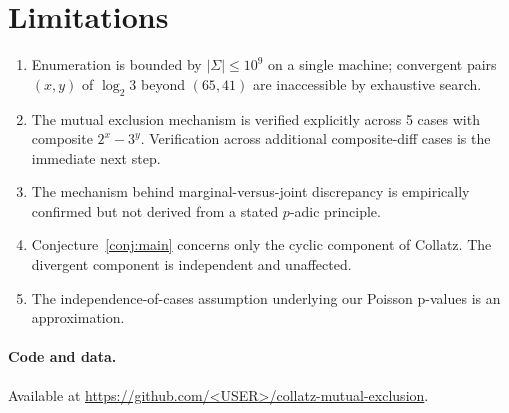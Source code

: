 \documentclass[11pt,a4paper]{article}
\theoremstyle{plain}
\theoremstyle{definition}
\begin{document}
\section{Limitations}

\begin{enumerate}\itemsep0pt
\item Enumeration is bounded by $|\Sigma| \le 10^9$ on a single machine; convergent pairs $(x, y)$ of $\log_2 3$ beyond $(65, 41)$ are inaccessible by exhaustive search.
\item The mutual exclusion mechanism is verified explicitly across 5 cases with composite $2^x - 3^y$. Verification across additional composite-diff cases is the immediate next step.
\item The mechanism behind marginal-versus-joint discrepancy is empirically confirmed but not derived from a stated $p$-adic principle.
\item Conjecture~\ref{conj:main} concerns only the cyclic component of Collatz. The divergent component is independent and unaffected.
\item The independence-of-cases assumption underlying our Poisson p-values is an approximation.
\end{enumerate}

\paragraph{Code and data.}
Available at \url{https://github.com/<USER>/collatz-mutual-exclusion}.
\end{document}
